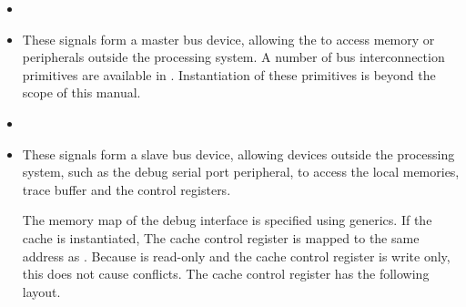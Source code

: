 \begin{itemize}

\item {}
\item {}

These signals form a master \rvex{} bus device, allowing the \rvex{} to access 
memory or peripherals outside the processing system. A number of bus 
interconnection primitives are available in . 
Instantiation of these primitives is beyond the scope of this manual.

\item {}
\item {}

These signals form a slave \rvex{} bus device, allowing devices outside the 
processing system, such as the debug serial port peripheral, to access the local 
memories, trace buffer and the \rvex{} control registers.

The memory map of the debug interface is specified using generics. If the cache
is instantiated, The cache control register is mapped to the same address as
. Because  is read-only and the cache control register is
write only, this does not cause conflicts. The cache control register has the
following layout.


\end{itemize}
